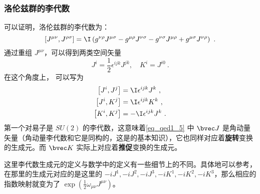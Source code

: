 \subsubsection{洛伦兹群的李代数}
可以证明，洛伦兹群的李代数为：
\begin{equation}\left[J^{\mu \nu}, J^{\rho \sigma}\right]=\I\left(g^{\nu \rho} J^{\mu \sigma}-g^{\mu \rho} J^{\nu \sigma}-g^{\nu \sigma} J^{\mu \rho}+g^{\mu \sigma} J^{\nu \rho}\right)~.\end{equation}
通过重组 $J^{\mu\nu}$，可以得到两类空间矢量
\begin{equation}\label{eq_qed1_5}J^{i}=\frac{1}{2} \epsilon^{i j k} J^{j k}, \quad K^{i}=J^{i 0}~.\end{equation}
在这个角度上， 可以写为
\begin{equation}\begin{aligned}
\left[J^{i}, J^{j}\right] &=\I \epsilon^{i j k} J^{k}~, \\
\left[J^{i}, K^{j}\right] &=\I \epsilon^{i j k} K^{k}~, \\
\left[K^{i}, K^{j}\right] &=-\I \epsilon^{i j k} J^{k}~.
\end{aligned}\end{equation}
第一个对易子是 $SU(2)$ 的李代数，这意味着\autoref{eq_qed1_5} 中 $\bvec J$ 是角动量矢量（角动量李代数和它是同构的，这是的基本知识），它也同样对应着\textbf{旋转}变换的生成元。而 $\bvec K$ 实际上对应着\textbf{推促}变换的生成元。

这里李代数生成元的定义与数学中的定义有一些细节上的不同。具体地可以参考，在那里的生成元对应的是这里的 $-iJ^1,-iJ^2,-iJ^3,-iK^1,-iK^2,-iK^3$，那么相应的指数映射就变为了 $\exp(\frac{1}{2}\omega_{\mu\nu}J^{\mu\nu})$。
